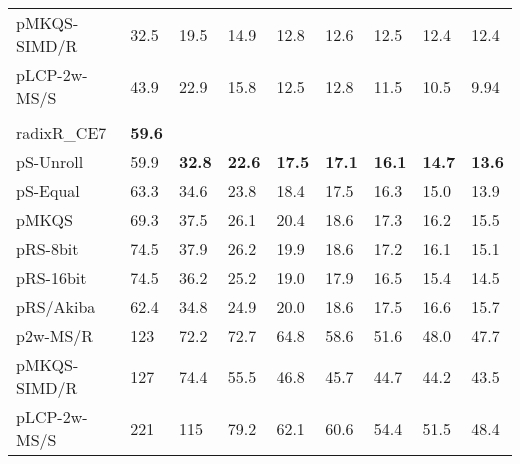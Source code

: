\documentclass[a4paper]{myjournal}
\begin{document}
\begin{table}
\begin{tabularx}{\linewidth}{l|*{8}{>{\hfill}X}|@{}}
 pMKQS-SIMD/R &     32.5 &     19.5 &     14.9 &     12.8 &     12.6 &     12.5 &     12.4 &     12.4 \\
 pLCP-2w-MS/S &     43.9 &     22.9 &     15.8 &     12.5 &     12.8 &     11.5 &     10.5 &     9.94 \\ \hline
& \multicolumn{8}{l|}{\textbf{Wikipedia}, , } \\ \cline{2-9}
radixR\_CE7 & \bf 59.6 &  &  &  &  &  &  &  \\
pS-Unroll & 59.9 & \bf 32.8 & \bf 22.6 & \bf 17.5 & \bf 17.1 & \bf 16.1 & \bf 14.7 & \bf 13.6 \\
 pS-Equal & 63.3 &     34.6 &     23.8 &     18.4 &     17.5 &     16.3 &     15.0 &     13.9 \\
        pMKQS & 69.3 &     37.5 &     26.1 &     20.4 &     18.6 &     17.3 &     16.2 &     15.5 \\
     pRS-8bit & 74.5 &     37.9 &     26.2 &     19.9 &     18.6 &     17.2 &     16.1 &     15.1 \\
    pRS-16bit & 74.5 &     36.2 &     25.2 &     19.0 &     17.9 &     16.5 &     15.4 &     14.5 \\
    pRS/Akiba & 62.4 &     34.8 &     24.9 &     20.0 &     18.6 &     17.5 &     16.6 &     15.7 \\
     p2w-MS/R &  123 &     72.2 &     72.7 &     64.8 &     58.6 &     51.6 &     48.0 &     47.7 \\
 pMKQS-SIMD/R &  127 &     74.4 &     55.5 &     46.8 &     45.7 &     44.7 &     44.2 &     43.5 \\
 pLCP-2w-MS/S &  221 &      115 &     79.2 &     62.1 &     60.6 &     54.4 &     51.5 &     48.4 \\ \hline
\end{tabularx}
\end{table}
\end{document}
